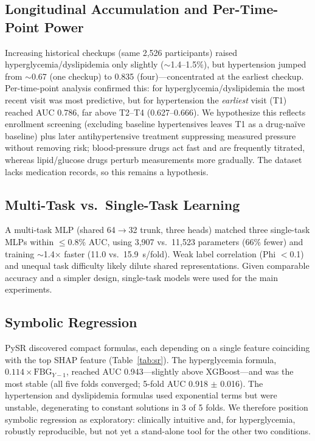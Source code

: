 \documentclass[journal]{IEEEtran}
\begin{document}
\subsection{Longitudinal Accumulation and Per-Time-Point Power}
Increasing historical checkups (same 2,526 participants) raised hyperglycemia/dyslipidemia only slightly ($\sim$1.4--1.5\%), but hypertension jumped from $\sim$0.67 (one checkup) to 0.835 (four)---concentrated at the earliest checkup. Per-time-point analysis confirmed this: for hyperglycemia/dyslipidemia the most recent visit was most predictive, but for hypertension the \emph{earliest} visit (T1) reached AUC 0.786, far above T2--T4 (0.627--0.666). We hypothesize this reflects enrollment screening (excluding baseline hypertensives leaves T1 as a drug-na\"ive baseline) plus later antihypertensive treatment suppressing measured pressure without removing risk; blood-pressure drugs act fast and are frequently titrated, whereas lipid/glucose drugs perturb measurements more gradually. The dataset lacks medication records, so this remains a hypothesis.

\subsection{Multi-Task vs.\ Single-Task Learning}
A multi-task MLP (shared 64$\rightarrow$32 trunk, three heads) matched three single-task MLPs within $\leq$0.8\% AUC, using 3,907 vs.\ 11,523 parameters (66\% fewer) and training $\sim$1.4$\times$ faster (11.0 vs.\ 15.9~s/fold). Weak label correlation (Phi $<$0.1) and unequal task difficulty likely dilute shared representations. Given comparable accuracy and a simpler design, single-task models were used for the main experiments.

\subsection{Symbolic Regression}
PySR discovered compact formulas, each depending on a single feature coinciding with the top SHAP feature (Table~\ref{tab:sr}). The hyperglycemia formula, $0.114\times\mathrm{FBG}_{Y-1}$, reached AUC 0.943---slightly above XGBoost---and was the most stable (all five folds converged; 5-fold AUC 0.918 $\pm$ 0.016). The hypertension and dyslipidemia formulas used exponential terms but were unstable, degenerating to constant solutions in 3 of 5 folds. We therefore position symbolic regression as exploratory: clinically intuitive and, for hyperglycemia, robustly reproducible, but not yet a stand-alone tool for the other two conditions.
\end{document}
